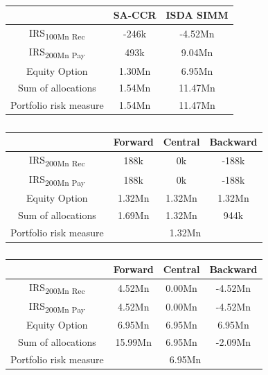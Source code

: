 \documentclass[../Thesis_AHoecherl.tex]{subfiles}
\begin{document}
    \begin{table}[htbp]
        \label{tab:hedge trade sample results}
        \centering
            \begin{tabular}{c|c|c}
                & SA-CCR & ISDA SIMM \\
                \toprule
                IRS\textsubscript{100Mn Rec} & -246k & -4.52Mn \\
                \midrule
                IRS\textsubscript{200Mn Pay} & 493k & 9.04Mn \\
                \midrule
                Equity Option & 1.30Mn & 6.95Mn \\
                \bottomrule
                Sum of allocations & 1.54Mn & 11.47Mn \\
                \midrule
                Portfolio risk measure & 1.54Mn & 11.47Mn \\
            \end{tabular}%
        \caption{}
    \end{table}

    \begin{table}[htbp]
        \label{tab:EAD perfect hedge}
        \centering
            \begin{tabular}{c|c|c|c}
                & Forward & Central & Backward \\
                \toprule
                IRS\textsubscript{200Mn Rec} & 188k & 0k & -188k \\
                \midrule
                IRS\textsubscript{200Mn Pay} & 188k & 0k & -188k\\
                \midrule
                Equity Option & 1.32Mn & 1.32Mn & 1.32Mn\\
                \bottomrule
                Sum of allocations & 1.69Mn & 1.32Mn & 944k \\
                \midrule
                Portfolio risk measure & \multicolumn{3}{c}{1.32Mn} \\
            \end{tabular}%
        \caption{}
    \end{table}

    \begin{table}[htbp]
        \label{tab:IM perfect hedge}
        \centering
            \begin{tabular}{c|c|c|c}
                & Forward & Central & Backward \\
                \toprule
                IRS\textsubscript{200Mn Rec} & 4.52Mn & 0.00Mn & -4.52Mn \\
                \midrule
                IRS\textsubscript{200Mn Pay} & 4.52Mn & 0.00Mn & -4.52Mn \\
                \midrule
                Equity Option & 6.95Mn & 6.95Mn & 6.95Mn \\
                \bottomrule
                Sum of allocations & 15.99Mn & 6.95Mn & -2.09Mn \\
                \midrule
                Portfolio risk measure & \multicolumn{3}{c}{6.95Mn}  \\
            \end{tabular}%
        \caption{}
    \end{table}
\end{document}
